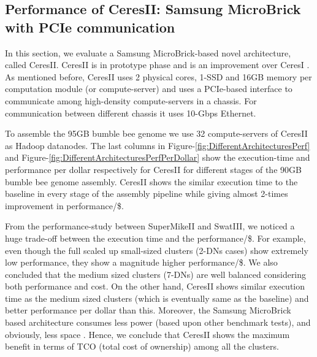 \documentclass[conference]{IEEEtran}
\begin{document}
\subsection {Performance of CeresII: Samsung MicroBrick with PCIe communication} \label{CeresII:Scaledout-in-a-boxAndSSD}
In this section, we evaluate a Samsung MicroBrick-based novel architecture, called CeresII. CeresII is in prototype phase and is an improvement over CeresI \cite{Cluster:ceres1}. 
As mentioned before, CeresII uses 2 physical cores, 1-SSD and 16GB memory per computation module (or compute-server) and uses a PCIe-based interface to communicate among high-density compute-servers in a chassis. For communication between different chassis it uses 10-Gbps Ethernet.

To assemble the 95GB bumble bee genome we use 32 compute-servers of CeresII as Hadoop datanodes.
The last columns in Figure-\ref{fig:DifferentArchitecturesPerf} and Figure-\ref{fig:DifferentArchitecturesPerfPerDollar} show the execution-time and performance per dollar respectively for CeresII for different stages of the 90GB bumble bee genome assembly.
CeresII shows the similar execution time to the baseline in every stage of the assembly pipeline while giving almost 2-times improvement in performance/\$.

From the performance-study between SuperMikeII and SwatIII, we noticed a huge trade-off between the execution time and the performance/\$. 
For example, even though the full scaled up small-sized clusters (2-DNs cases) show extremely low performance, they show a magnitude higher performance/\$. We also concluded that the medium sized clusters (7-DNs) are well balanced considering both performance and cost.
On the other hand, CeresII shows similar execution time as the medium sized clusters (which is eventually same as the baseline) and better performance per dollar than this. Moreover, the Samsung MicroBrick based architecture consumes less power (based upon other benchmark tests), and obviously, less space \cite{Cluster:ceres1}. Hence, we conclude that CeresII shows the maximum benefit in terms of TCO (total cost of ownership) among all the clusters.
\end{document}
